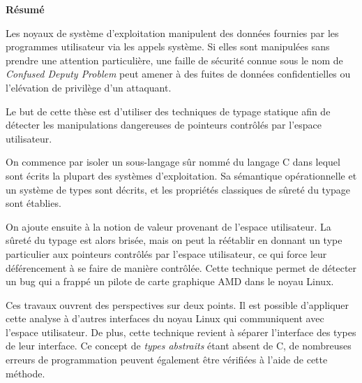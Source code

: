 \cleartoverso{}

\begin{headingpage}
\thispagestyle{empty}

\begin{center}\Large \textbf{Résumé}\end{center}

Les noyaux de système d'exploitation manipulent des données fournies par les
programmes utilisateur via les appels système. Si elles sont manipulées sans
prendre une attention particulière, une faille de sécurité connue sous le nom de
\emph{Confused Deputy Problem} peut amener à des fuites de données
confidentielles ou l'elévation de privilège d'un attaquant.

Le but de cette thèse est d'utiliser des techniques de typage statique afin de
détecter les manipulations dangereuses de pointeurs contrôlés par l'espace
utilisateur.

On commence par isoler un sous-langage sûr nommé \langname{} du langage C dans
lequel sont écrits la plupart des systèmes d'exploitation. Sa sémantique
opérationnelle et un système de types sont décrits, et les propriétés classiques
de sûreté du typage sont établies.

On ajoute ensuite à \langname{} la notion de valeur provenant de l'espace
utilisateur. La sûreté du typage est alors brisée, mais on peut la réétablir en
donnant un type particulier aux pointeurs contrôlés par l'espace utilisateur, ce
qui force leur déférencement à se faire de manière contrôlée. Cette technique
permet de détecter un bug qui a frappé un pilote de carte graphique AMD dans le
noyau Linux.

Ces travaux ouvrent des perspectives sur deux points. Il est possible
d'appliquer cette analyse à d'autres interfaces du noyau Linux qui communiquent
avec l'espace utilisateur. De plus, cette technique revient à séparer
l'interface des types de leur interface. Ce concept de \emph{types abstraits}
étant absent de C, de nombreuses erreurs de programmation peuvent également être
vérifiées à l'aide de cette méthode.




\end{headingpage}
